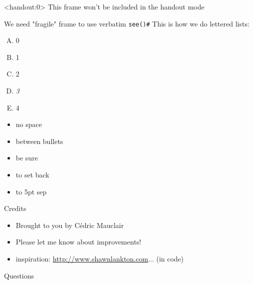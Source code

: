 \documentclass[xcolor=svgnames]{beamer}
\newcommand{\yellow}[1]{\textcolor{iyellow}{#1}}
\begin{document}
\begin{frame}<handout:0>
This frame won't be included in the handout mode
\end{frame}


\begin{frame}[fragile]
We need "fragile" frame to use verbatim \verb|see()#|
This is how we do lettered lists:
\begin{enumerate}[A)]
\item  0		
\item 1		
\item 2		
\item \emph{\yellow 3}		
\item 4
\end{enumerate}

 \begin{itemize} \setlength{\itemsep}{0pt}
\item no space 
\item between bullets
\end{itemize}


 \begin{itemize} \setlength{\itemsep}{5pt}
\item be sure
\item to set back
\item to 5pt sep
\end{itemize}


\end{frame}






\begin{frame}
  {Credits}

  \begin{itemize}
  \item Brought to you by Cédric Mauclair
  \item Please let me know about improvements!
  \item inspiration: \url{http://www.shawnlankton.com}... (in code)
  \end{itemize}
\end{frame}


\begin{frame}
  {Questions}

  \nocite{lorem,ipsum}
  
  

\end{frame}
\end{document}
